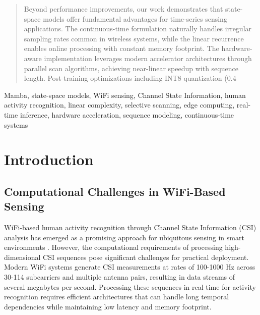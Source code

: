 \documentclass[10pt,journal,compsoc]{IEEEtran}
\begin{document}
\begin{abstract}
Beyond performance improvements, our work demonstrates that state-space models offer fundamental advantages for time-series sensing applications. The continuous-time formulation naturally handles irregular sampling rates common in wireless systems, while the linear recurrence enables online processing with constant memory footprint. The hardware-aware implementation leverages modern accelerator architectures through parallel scan algorithms, achieving near-linear speedup with sequence length. Post-training optimizations including INT8 quantization (0.4%
\end{abstract}

\begin{IEEEkeywords}
Mamba, state-space models, WiFi sensing, Channel State Information, human activity recognition, linear complexity, selective scanning, edge computing, real-time inference, hardware acceleration, sequence modeling, continuous-time systems
\end{IEEEkeywords}

\section{Introduction}
\label{sec:introduction}

\subsection{Computational Challenges in WiFi-Based Sensing}

WiFi-based human activity recognition through Channel State Information (CSI) analysis has emerged as a promising approach for ubiquitous sensing in smart environments \cite{yang2023sensefi}. However, the computational requirements of processing high-dimensional CSI sequences pose significant challenges for practical deployment. Modern WiFi systems generate CSI measurements at rates of 100-1000 Hz across 30-114 subcarriers and multiple antenna pairs, resulting in data streams of several megabytes per second. Processing these sequences in real-time for activity recognition requires efficient architectures that can handle long temporal dependencies while maintaining low latency and memory footprint.
\end{document}
